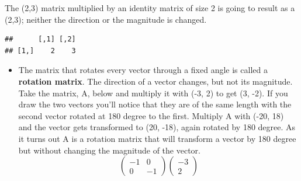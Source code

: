\documentclass[]{article}
\newenvironment{Shaded}{\begin{snugshade}}{\end{snugshade}}
\newcommand{\DataTypeTok}[1]{\textcolor[rgb]{0.13,0.29,0.53}{#1}}
\newcommand{\DecValTok}[1]{\textcolor[rgb]{0.00,0.00,0.81}{#1}}
\newcommand{\KeywordTok}[1]{\textcolor[rgb]{0.13,0.29,0.53}{\textbf{#1}}}
\newcommand{\NormalTok}[1]{#1}
\newcommand{\OperatorTok}[1]{\textcolor[rgb]{0.81,0.36,0.00}{\textbf{#1}}}
\newcommand{\StringTok}[1]{\textcolor[rgb]{0.31,0.60,0.02}{#1}}
\providecommand{\tightlist}{%
  \setlength{\itemsep}{0pt}\setlength{\parskip}{0pt}}
\begin{document}
The (2,3) matrix multiplied by an identity matrix of size 2 is going to
result as a (2,3); neither the direction or the magnitude is changed.

\begin{Shaded}
\end{Shaded}

\begin{verbatim}
##      [,1] [,2]
## [1,]    2    3
\end{verbatim}

\begin{itemize}
\tightlist
\item
  The matrix that rotates every vector through a fixed angle is called a
  \textbf{rotation matrix}. The direction of a vector changes, but not
  its magnitude. Take the matrix, A, below and multiply it with (-3, 2)
  to get (3, -2). If you draw the two vectors you'll notice that they
  are of the same length with the second vector rotated at 180 degree to
  the first. Multiply A with (-20, 18) and the vector gets transformed
  to (20, -18), again rotated by 180 degree. As it turns out A is a
  rotation matrix that will transform a vector by 180 degree but without
  changing the magnitude of the vector. \[
  \left(\begin{array}{cc} 
  -1 & 0\\ 
  0 & -1 
  \end{array}\right)
  \left(\begin{array}{cc} 
  -3\\ 
  2
  \end{array}\right)
  \]
\end{itemize}

\begin{Shaded}
\end{Shaded}
\end{document}
